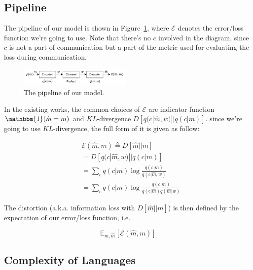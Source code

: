 \documentclass[11pt]{article}
\begin{document}
\subsection{Pipeline}
\label{ssec:pipeline}

The pipeline of our model is shown in Figure~\ref{fig:pipeline}, where $\mathcal{E}$ denotes the error/loss function we're going to use.
Note that there's no $c$ involved in the diagram, since $c$ is not a part of communication but a part of the metric used for evaluating the loss during communication.

\begin{figure}[h]
    \centering
    \includegraphics[width=0.49\textwidth]{docs/intro_rate_distortion/graphs/cog_communication.pdf}
    \caption{The pipeline of our model.}
    \label{fig:pipeline}
\end{figure}

In the existing works, the common choices of $\mathcal{E}$ are indicator function $\mathbbm{1}(\hat{m}=m)$ and $KL$-divergence $D[q(c|\hat{m},w)||q(c|m)]$.
since we're going to use $KL$-divergence, the full form of it is given as follow:

\begin{equation}
\begin{split}
    & \mathcal{E}(\hat{m}, m) \triangleq  D[\hat{m}||m] \\
    & = D[q(c|\hat{m},w)||q(c|m)]  \\
    & = \sum_{c} q(c|m) \log \frac{q(c|m)}{q(c|\hat{m},w)} \\
    & = \sum_{c} q(c|m) \log \frac{q(c|m)}{q(c|\hat{m})q(\hat{m}|w)}
\end{split}
\label{eq:comm_loss_function}
\end{equation}

The distortion (a.k.a. information loss with $D[\hat{m}||m]$) is then defined by the expectation of our error/loss function, i.e.

\begin{equation}
    \mathbb{E}_{m,\hat{m}}\left[\mathcal{E}(\hat{m},m)\right]
    \label{eq:distortion}
\end{equation}


\subsection{Complexity of Languages}
\label{ssec:complexity}
\end{document}
